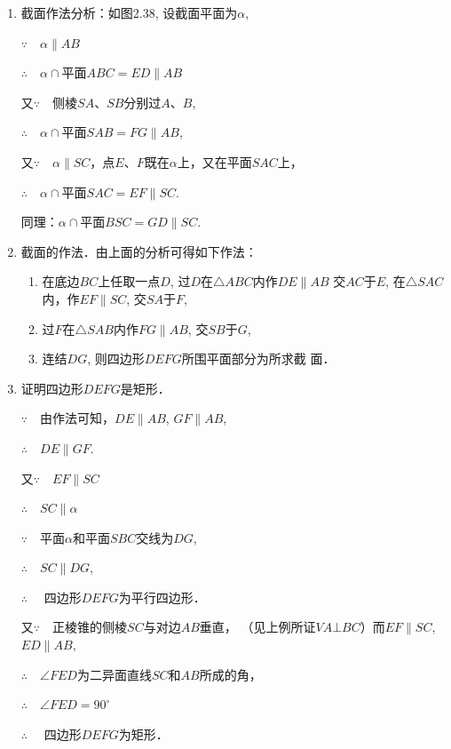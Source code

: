 \begin{solution}
\begin{enumerate}
    \item 截面作法分析：如图2.38, 设截面平面为$\alpha$, 
    
$\because\quad \alpha\parallel AB$

$\therefore\quad \alpha\cap$平面$ABC=ED\parallel AB$

又$\because\quad $侧棱$SA$、$SB$分别过$A$、$B$,

$\therefore\quad \alpha\cap$平面$SAB=FG\parallel AB$,

又$\because\quad \alpha\parallel SC$，点$E$、$F$既在$\alpha$上，又在平面$SAC$上，

$\therefore\quad \alpha\cap$平面$SAC=EF\parallel SC$.

同理：$\alpha\cap$平面$BSC=GD\parallel SC$.

\item 截面的作法．由上面的分析可得如下作法：
\begin{enumerate}
    \item 在底边$BC$上任取一点$D$, 过$D$在$\triangle ABC$内作$DE\parallel AB$
    交$AC$于$E$, 在$\triangle SAC$内，作$EF\parallel SC$, 交$SA$于$F$,
    \item  过$F$在$\triangle SAB$内作$FG\parallel AB$, 交$SB$于$G$, 
    \item 连结$DG$, 则四边形$DEFG$所围平面部分为所求截
    面．
\end{enumerate}

\item 证明四边形$DEFG$是矩形．


$\because\quad $由作法可知，$DE\parallel AB$, $GF\parallel AB$, 

$\therefore\quad DE\parallel GF$.

又$\because\quad EF\parallel SC$

$\therefore\quad SC\parallel \alpha$

$\because\quad $平面$\alpha$和平面$SBC$交线为$DG$,

$\therefore\quad SC\parallel DG$,

$\therefore\quad$ 四边形$DEFG$为平行四边形．

又$\because\quad $正棱锥的侧棱$SC$与对边$AB$垂直，
（见上例所证$VA\bot BC$）而$EF\parallel SC$, $ED\parallel AB$,

$\therefore\quad \angle FED$为二异面直线$SC$和$AB$所成的角，

$\therefore\quad \angle FED=90^{\circ}$

$\therefore\quad $ 四边形$DEFG$为矩形．


\end{enumerate}
\end{solution}
